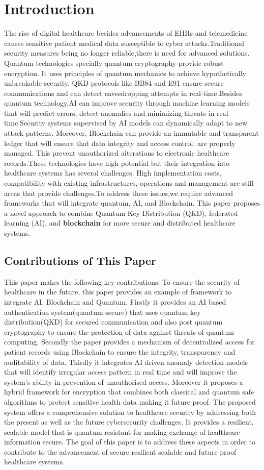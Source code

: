 \documentclass[pdflatex,sn-mathphys-num]{sn-jnl}%
\theoremstyle{thmstyleone}%
\theoremstyle{thmstyletwo}%
\theoremstyle{thmstylethree}%
\begin{document}
\section{Introduction}
The rise of digital healthcare besides advancements of EHRs\cite{bib4} and telemedicine causes sensitive patient medical data susceptible to cyber attacks.Traditional security measures being no longer reliable,there is need for advanced solutions. Quantum technologies specially quantum cryptography provide robust encryption. It uses principles of quantum mechanics to achieve hypothetically unbreakable security. QKD protocols\cite{bib5} like BB84 and E91 ensure secure communications and can detect eavesdropping attempts in real-time.Besides quantum technology,AI can improve security through machine learning models that will predict errors, detect anomalies and minimizing threats in real-time.Security systems supervised by AI models can dynamically adapt to new attack patterns. Moreover, Blockchain can provide an immutable and transparent ledger that will ensure that data integrity and access control. are properly managed. This prevent unauthorized alterations to electronic healthcare records.These technologies have high potential but their integration into healthcare systems has several challenges. High implementation costs, compatibility with existing infrastructures, operations and management are still areas that provide challenges.To address these issues,we require advanced frameworks that will integrate quantum, AI, and Blockchain. This paper proposes a novel approach to combine Quantum Key Distribution (QKD), federated learning (AI), and \textbf{blockchain} for more secure and distributed healthcare systems.


\subsection{Contributions of This Paper}
This paper makes the following key contributions:
To ensure the security of healthcare in the future, this paper provides an example of framework to integrate AI, Blockchain and Quantum. Firstly it provides an AI based  authentication system(quantum secure) that uses quantum key distribution(QKD) for secured communication and also post quantum cryptography to ensure the protection of data against threats of quantum computing. Secondly the paper provides a mechanism of decentralized access for patient records using Blockchain to ensure the integrity, transparency and auditability of data. Thirdly it integrates AI driven anomaly detection models that will identify irregular access pattern in real time and will improve the system's ability in prevention of unauthorised access. Moreover it proposes a hybrid framework for encryption that combines both classical and quantum safe algorithms to protect sensitive health data making it future proof. The proposed system offers a comprehensive solution to healthcare security by addressing both the present as well as the future cybersecurity challenges. It provides a resilient, scalable model that is quantum resistant for making exchange of healthcare information secure.
The goal of this paper is to address these aspects in order to contribute to the advancement of secure resilient scalable and future proof healthcare systems.
\end{document}
